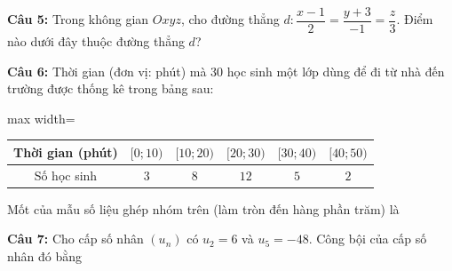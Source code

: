 \documentclass[12pt,a4paper]{article}
\begin{document}
\noindent \textbf{Câu 5:} Trong không gian $Oxyz$, cho đường thẳng $d\colon \dfrac{x-1}{2}=\dfrac{y+3}{-1}=\dfrac{z}{3}$. Điểm nào dưới đây thuộc đường thẳng $d$?\\
\noindent{}

\noindent \textbf{Câu 6:} Thời gian (đơn vị: phút) mà 30 học sinh một lớp dùng để đi từ nhà đến trường được thống kê trong bảng sau:\\
\begin{center}
\begin{adjustbox}{max width=\linewidth}
\begin{tabular}{|c|c|c|c|c|c|}
\hline
Thời gian (phút) & $[0;10)$ & $[10;20)$ & $[20;30)$ & $[30;40)$ & $[40;50)$\\
\hline
Số học sinh & $3$ & $8$ & $12$ & $5$ & $2$\\
\hline
\end{tabular}
\end{adjustbox}
\end{center}
Mốt của mẫu số liệu ghép nhóm trên (làm tròn đến hàng phần trăm) là\\
\noindent{}

\noindent \textbf{Câu 7:} Cho cấp số nhân $(u_n)$ có $u_2=6$ và $u_5=-48$. Công bội của cấp số nhân đó bằng\\
\noindent{}
\end{document}
